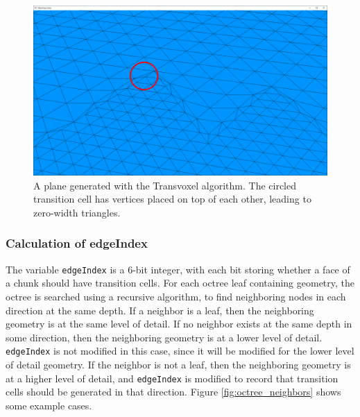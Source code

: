\documentclass[11pt]{article}
\begin{document}
\begin{enumerate}
\begin{figure}[H]
  \includegraphics[width=\textwidth]{tv_transition_plane}
  \caption{A plane generated with the Transvoxel algorithm. The circled transition cell has vertices placed on top of each other, leading to zero-width triangles.}
  \label{fig:tv_transition_plane}
\end{figure}

\end{enumerate}

\subsubsection{Calculation of edgeIndex}
\label{section:edgeIndex}

The variable \texttt{edgeIndex} is a 6-bit integer, with each bit storing whether a face of a chunk should have transition cells. For each octree leaf containing geometry, the octree is searched using a recursive algorithm, to find neighboring nodes in each direction at the same depth. If a neighbor is a leaf, then the neighboring geometry is at the same level of detail. If no neighbor exists at the same depth in some direction, then the neighboring geometry is at a lower level of detail. \texttt{edgeIndex} is not modified in this case, since it will be modified for the lower level of detail geometry. If the neighbor is not a leaf, then the neighboring geometry is at a higher level of detail, and \texttt{edgeIndex} is modified to record that transition cells should be generated in that direction. Figure \ref{fig:octree_neighbors} shows some example cases.
\end{document}
